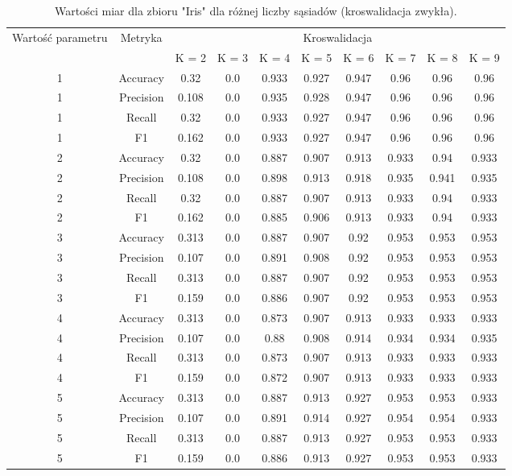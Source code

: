 
\begin{table}[H]
    \begin{tabular}{c|c|cccccccc}
       \multirow{2}{*}{Wartość parametru} & \multirow{2}{*}{Metryka} & \multicolumn{8}{|c|}{Kroswalidacja} \\
         & & K = 2 & K = 3 & K = 4 & K = 5 & K = 6 & K = 7 & K = 8 & K = 9 \\ \hline
         1&Accuracy&0.32& 0.0& 0.933& 0.927& 0.947& 0.96& 0.96& 0.96\\ \hline
1&Precision&0.108& 0.0& 0.935& 0.928& 0.947& 0.96& 0.96& 0.96\\ \hline
1&Recall&0.32& 0.0& 0.933& 0.927& 0.947& 0.96& 0.96& 0.96\\ \hline
1&F1&0.162& 0.0& 0.933& 0.927& 0.947& 0.96& 0.96& 0.96\\ \hline
2&Accuracy&0.32& 0.0& 0.887& 0.907& 0.913& 0.933& 0.94& 0.933\\ \hline
2&Precision&0.108& 0.0& 0.898& 0.913& 0.918& 0.935& 0.941& 0.935\\ \hline
2&Recall&0.32& 0.0& 0.887& 0.907& 0.913& 0.933& 0.94& 0.933\\ \hline
2&F1&0.162& 0.0& 0.885& 0.906& 0.913& 0.933& 0.94& 0.933\\ \hline
3&Accuracy&0.313& 0.0& 0.887& 0.907& 0.92& 0.953& 0.953& 0.953\\ \hline
3&Precision&0.107& 0.0& 0.891& 0.908& 0.92& 0.953& 0.953& 0.953\\ \hline
3&Recall&0.313& 0.0& 0.887& 0.907& 0.92& 0.953& 0.953& 0.953\\ \hline
3&F1&0.159& 0.0& 0.886& 0.907& 0.92& 0.953& 0.953& 0.953\\ \hline
4&Accuracy&0.313& 0.0& 0.873& 0.907& 0.913& 0.933& 0.933& 0.933\\ \hline
4&Precision&0.107& 0.0& 0.88& 0.908& 0.914& 0.934& 0.934& 0.935\\ \hline
4&Recall&0.313& 0.0& 0.873& 0.907& 0.913& 0.933& 0.933& 0.933\\ \hline
4&F1&0.159& 0.0& 0.872& 0.907& 0.913& 0.933& 0.933& 0.933\\ \hline
5&Accuracy&0.313& 0.0& 0.887& 0.913& 0.927& 0.953& 0.953& 0.933\\ \hline
5&Precision&0.107& 0.0& 0.891& 0.914& 0.927& 0.954& 0.954& 0.933\\ \hline
5&Recall&0.313& 0.0& 0.887& 0.913& 0.927& 0.953& 0.953& 0.933\\ \hline
5&F1&0.159& 0.0& 0.886& 0.913& 0.927& 0.953& 0.953& 0.933 \\ \hline
    \end{tabular}
    \caption{Wartości miar dla zbioru "Iris" dla różnej liczby sąsiadów (kroswalidacja zwykła).}
\end{table}
    